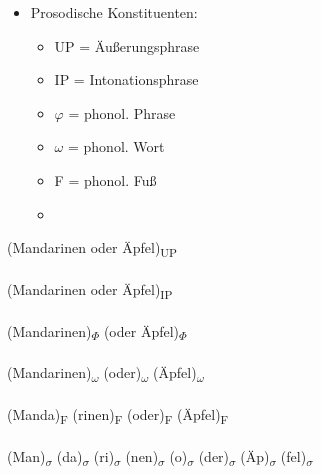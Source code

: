 
\begin{frame}


\begin{itemize}
	\item Prosodische Konstituenten:
	\begin{multicols}{2}
	\begin{itemize}
		\item UP = Äußerungsphrase
		\item IP = Intonationsphrase
		\item $\varphi$ = phonol. Phrase
\columnbreak
		\item $\omega$ = phonol. Wort
		\item F = phonol. Fuß
		\item {}
	\end{itemize}
	\end{multicols}
\end{itemize}

\begin{minipage}{0.39\textwidth}
	\begin{figure}
	\centering
		\caption{\cite{Fuhrhop&Co13a}}
	\end{figure}
\end{minipage}\hfill%
\begin{minipage}{0.6\textwidth}
	\footnotesize{(Mandarinen oder Äpfel)\textsubscript{UP}\\
	\\
	(Mandarinen oder Äpfel)\textsubscript{IP}\\
	\\
	(Mandarinen)\textsubscript{$\Phi$} (oder Äpfel)\textsubscript{$\Phi$}\\
	\\
	(Mandarinen)\textsubscript{$\omega$} (oder)\textsubscript{$\omega$} (Äpfel)\textsubscript{$\omega$}\\
	\\
	(Manda)\textsubscript{F} (rinen)\textsubscript{F} (oder)\textsubscript{F} (Äpfel)\textsubscript{F} \\
	\\
	(Man)\textsubscript{$\sigma$} (da)\textsubscript{$\sigma$} (ri)\textsubscript{$\sigma$} (nen)\textsubscript{$\sigma$} (o)\textsubscript{$\sigma$} (der)\textsubscript{$\sigma$} (Äp)\textsubscript{$\sigma$} (fel)\textsubscript{$\sigma$}
}
\vspace{1cm}
\end{minipage}


%	


\end{frame}



